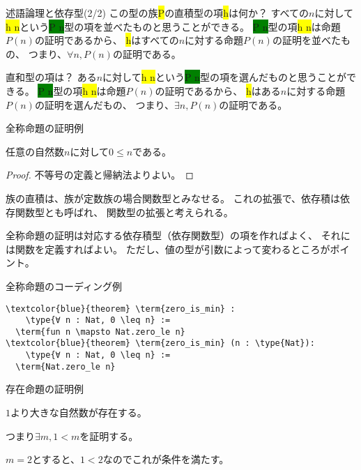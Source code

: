 \documentclass[unicode,12pt]{beamer}%
\newcommand{\type}[1]{\colorbox{green}{#1}}
\newcommand{\term}[1]{\colorbox{yellow}{#1}}
\begin{document}
\begin{frame}{述語論理と依存型(2/2)}
  この型の族\term{P}の直積型の項\term{h}は何か？
  すべての$n$に対して\term{h n}という\type{P n}型の項を並べたものと思うことができる。
  \type{P n}型の項\term{h n}は命題$P(n)$の証明であるから、
  \term{h}はすべての$n$に対する命題$P(n)$の証明を並べたもの、
  つまり、$\forall n, P(n)$の証明である。

  \pause

  直和型の項は？
  ある$n$に対して\term{h n}という\type{P n}型の項を選んだものと思うことができる。
  \type{P n}型の項\term{h n}は命題$P(n)$の証明であるから、
  \term{h}はある$n$に対する命題$P(n)$の証明を選んだもの、
  つまり、$\exists n, P(n)$の証明である。
\end{frame}

\begin{frame}{全称命題の証明例}
  \begin{theorem}
    任意の自然数$n$に対して$0\leq n$である。
  \end{theorem}

  \begin{proof}
    不等号の定義と帰納法よりよい。
  \end{proof}

  \pause
  族の直積は、族が定数族の場合関数型とみなせる。
  これの拡張で、依存積は依存関数型とも呼ばれ、
  関数型の拡張と考えられる。

  \pause

  全称命題の証明は対応する依存積型（依存関数型）の項を作ればよく、
  それには関数を定義すればよい。
  ただし、値の型が引数によって変わるところがポイント。
\end{frame}

\begin{frame}[fragile]{全称命題のコーディング例}
  \begin{tcolorbox}[title=Quantifier.lean]
  \setlength{\baselineskip}{12pt}
  \begin{Verbatim}[commandchars=\\\{\}, baselinestretch=1.5]
\textcolor{blue}{theorem} \term{zero_is_min} :
    \type{∀ n : Nat, 0 \leq n} :=
  \term{fun n \mapsto Nat.zero_le n}
\textcolor{blue}{theorem} \term{zero_is_min} (n : \type{Nat}):
    \type{∀ n : Nat, 0 \leq n} :=
  \term{Nat.zero_le n}
  \end{Verbatim}
  \end{tcolorbox}  
\end{frame}

\begin{frame}{存在命題の証明例}
  \begin{theorem}
    $1$より大きな自然数が存在する。    
  \end{theorem}

  つまり$\exists m, 1 < m$を証明する。

  \begin{problem}
    $m=2$とすると、$1 < 2$なのでこれが条件を満たす。    
  \end{problem}
\end{frame}
\end{document}
